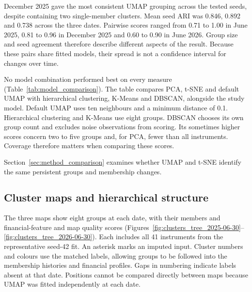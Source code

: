 December 2025 gave the most consistent UMAP grouping across the tested seeds, despite containing two single-member clusters. Mean seed ARI was 0.846, 0.892 and 0.738 across the three dates. Pairwise scores ranged from 0.71 to 1.00 in June 2025, 0.81 to 0.96 in December 2025 and 0.60 to 0.90 in June 2026. Group size and seed agreement therefore describe different aspects of the result. Because these pairs share fitted models, their spread is not a confidence interval for changes over time.

No model combination performed best on every measure (Table~\ref{tab:model_comparison}). The table compares PCA, t-SNE and default UMAP with hierarchical clustering, K-Means and DBSCAN, alongside the study model. Default UMAP uses ten neighbours and a minimum distance of 0.1. Hierarchical clustering and K-Means use eight groups. DBSCAN chooses its own group count and excludes noise observations from scoring. Its sometimes higher scores concern two to five groups and, for PCA, fewer than all instruments. Coverage therefore matters when comparing these scores.

\begin{table}[htbp]
\centering\caption{Complete comparison of dimensionality-reduction and clustering combinations at the representative seed. Map scores use the reduced representation and feature scores the eight scaled financial features. Combinations without a stated group count use eight groups and assign all 41 instruments; DBSCAN chooses its own number of groups, and its scores exclude noise observations.}\label{tab:model_comparison}
\footnotesize

\end{table}

Section~\ref{sec:method_comparison} examines whether UMAP and t-SNE identify the same persistent groups and membership changes.

\FloatBarrier
\subsection{Cluster maps and hierarchical structure}

The three maps show eight groups at each date, with their members and financial-feature and map quality scores (Figures~\ref{fig:clusters_tree_2025-06-30}--\ref{fig:clusters_tree_2026-06-30}). Each includes all 41 instruments from the representative seed-42 fit. An asterisk marks an imputed input. Cluster numbers and colours use the matched labels, allowing groups to be followed into the membership histories and financial profiles. Gaps in numbering indicate labels absent at that date. Positions cannot be compared directly between maps because UMAP was fitted independently at each date.

